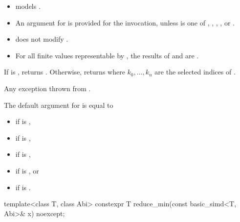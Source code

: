 \begin{itemdescr}
\pnum
\constraints
\begin{itemize}
\item
   models
  .
\item
  An argument for  is provided for the invocation,
  unless  is one of ,
  , , , or
  .
\end{itemize}

\pnum
\expects
\begin{itemize}
 \item
    does not modify .
 \item
   For all finite values  representable by , the results of
    and  are .
\end{itemize}

\pnum
\returns
If  is , returns .
Otherwise, returns  where $k_0, \ldots, k_n$ are
the selected indices of .

\pnum
\throws
Any exception thrown from .

\pnum
\remarks
The default argument for  is equal to
\begin{itemize}
\item {} if  is ,
\item {} if  is ,
\item {} if  is ,
\item {} if  is , or
\item {} if  is .
\end{itemize}
\end{itemdescr}

\begin{itemdecl}
template<class T, class Abi> constexpr T reduce_min(const basic_simd<T, Abi>& x) noexcept;
\end{itemdecl}


